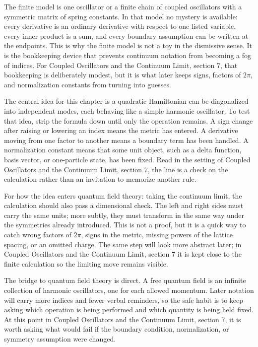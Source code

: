 The finite model is one oscillator or a finite chain of coupled oscillators with a symmetric matrix of spring constants.  In that model no mystery is available: every derivative is an ordinary derivative with respect to one listed variable, every inner product is a sum, and every boundary assumption can be written at the endpoints.  This is why the finite model is not a toy in the dismissive sense.  It is the bookkeeping device that prevents continuum notation from becoming a fog of indices.  For Coupled Oscillators and the Continuum Limit, section 7, that bookkeeping is deliberately modest, but it is what later keeps signs, factors of \(2\pi\), and normalization constants from turning into guesses.

The central idea for this chapter is a quadratic Hamiltonian can be diagonalized into independent modes, each behaving like a simple harmonic oscillator.  To test that idea, strip the formula down until only the operation remains.  A sign change after raising or lowering an index means the metric has entered.  A derivative moving from one factor to another means a boundary term has been handled.  A normalization constant means that some unit object, such as a delta function, basis vector, or one-particle state, has been fixed.  Read in the setting of Coupled Oscillators and the Continuum Limit, section 7, the line is a check on the calculation rather than an invitation to memorize another rule.

For how the idea enters quantum field theory: taking the continuum limit, the calculation should also pass a dimensional check.  The left and right sides must carry the same units; more subtly, they must transform in the same way under the symmetries already introduced.  This is not a proof, but it is a quick way to catch wrong factors of \(2\pi\), signs in the metric, missing powers of the lattice spacing, or an omitted charge.  The same step will look more abstract later; in Coupled Oscillators and the Continuum Limit, section 7 it is kept close to the finite calculation so the limiting move remains visible.

The bridge to quantum field theory is direct.  A free quantum field is an infinite collection of harmonic oscillators, one for each allowed momentum.  Later notation will carry more indices and fewer verbal reminders, so the safe habit is to keep asking which operation is being performed and which quantity is being held fixed.  At this point in Coupled Oscillators and the Continuum Limit, section 7, it is worth asking what would fail if the boundary condition, normalization, or symmetry assumption were changed.

